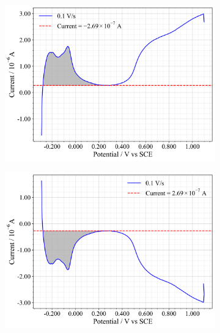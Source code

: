 \begin{figure}[htbp]
    \centering
    \begin{subfigure}{0.49\textwidth}
        \centering
        \includegraphics[width=\linewidth]{figures2/5-1.png}
    \end{subfigure}
    \hfill
    \begin{subfigure}{0.49\textwidth}
        \centering
        \includegraphics[width=\linewidth]{figures2/5-2.png}
    \end{subfigure}
    \vspace{1em} %
    \begin{subfigure}{0.49\textwidth}
        \centering

\end{subfigure}
\end{figure}
